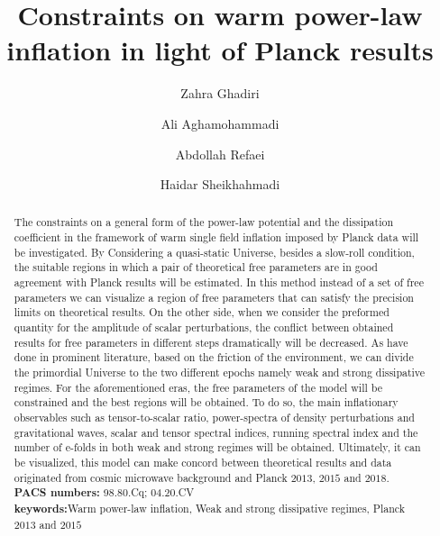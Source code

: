 \documentclass[12pt]{revtex4}
\begin{document}
\title{Constraints on warm power-law inflation in light of Planck results}


\author{Zahra Ghadiri}
\author{Ali Aghamohammadi}
\author{Abdollah Refaei}
\author{Haidar Sheikhahmadi}


\begin{abstract}
The constraints on a general form of  the power-law potential and  the dissipation coefficient in the framework of warm single field inflation imposed by Planck data will be investigated. {By Considering a  quasi-static Universe, besides a slow-roll condition, the suitable regions in which a pair of theoretical free parameters are in good agreement with Planck results will be estimated}. In this method instead of a set of free parameters we can visualize a region of free parameters that can satisfy the precision limits on theoretical results. On the other side, when we consider the preformed quantity for the amplitude of scalar perturbations, the conflict between obtained results for free parameters in different steps dramatically will be decreased. {As have done in prominent} literature, based on the friction of the environment,  we can divide the primordial Universe to the two different epochs namely weak and strong dissipative regimes. For the aforementioned eras, the free parameters of the model will be constrained and the best regions will be obtained. To do so, the main
inflationary observables such as tensor-to-scalar ratio, power-spectra of density perturbations and gravitational waves, scalar and tensor spectral indices, running
spectral index and the number of e-folds in both weak and strong regimes will be obtained. Ultimately, it can be visualized, this model  can make concord between theoretical results and  data originated from cosmic microwave background and Planck $2013$, $2015$ and $2018$.
\\
\textbf{PACS numbers:} 98.80.Cq; 04.20.CV\\
\textbf{keywords:}Warm power-law inflation, Weak and strong dissipative regimes, Planck $2013$ and $2015$
\end{abstract}
\end{document}
